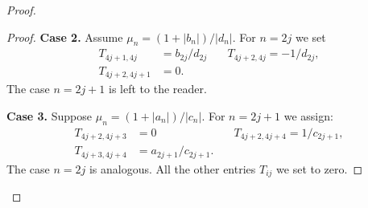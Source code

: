 \documentclass[12pt]{amsart}
\theoremstyle{case}
\begin{document}
\begin{proof}
\begin{proof}
          \noindent\textbf{Case 2.} Assume $\mu_n = (1 + |b_n|)/|d_n|$. 
          For $n=2j$ we set
          \begin{align*}
            T_{4j+1,4j} &= b_{2j}/d_{2j} & \quad T_{4j+2,4j} = -1/d_{2j},\\
            T_{4j+2,4j+1} &= 0.
          \end{align*}
          The case $n = 2j + 1$ is left to the reader.

          \noindent\textbf{Case 3.} Suppose $\mu_n = (1 + |a_n|)/|c_n|$. 
          For $n = 2j + 1$ we assign:
          \begin{align*}
            T_{4j+2,4j+3} &= 0 & \quad T_{4j+2,4j+4} = 1/c_{2j+1},\\
            T_{4j+3,4j+4} &= a_{2j+1}/c_{2j+1}.
          \end{align*}
          The case $n = 2j$ is analogous.
          All the other entries $T_{ij}$ we set to zero.


\end{proof}
\end{proof}
\end{document}
